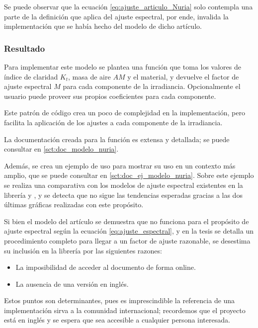 Se puede observar que la ecuación \ref{eq:ajuste_articulo_Nuria} solo contempla una parte de la definición que aplica del ajuste espectral, por ende, invalida la implementación que se había hecho del modelo de dicho artículo.

\subsubsection{Resultado}

Para implementar este modelo se plantea una función que toma los valores de índice de claridad $K_t$, masa de aire $AM$ y el material, y devuelve el factor de ajuste espectral $M$ para cada componente de la irradiancia. Opcionalmente el usuario puede proveer sus propios coeficientes para cada componente.

Este patrón de código crea un poco de complejidad en la implementación, pero facilita la aplicación de los ajustes a cada componente de la irradiancia.

La documentación creada para la función es extensa y detallada; se puede consultar en \ref{sct:doc_modelo_nuria}.

Además, se crea un ejemplo de uso para mostrar su uso en un contexto más amplio, que se puede consultar en \ref{sct:doc_ej_modelo_nuria}. Sobre este ejemplo se realiza una comparativa con los modelos de ajuste espectral existentes en la librería \cite{Lee_Panchula_2016} y \cite{osti919131}, y se detecta que no sigue las tendencias esperadas gracias a las dos últimas gráficas realizadas con este propósito.

Si bien el modelo del artículo \cite{Martín_Ruiz_1999} se demuestra que no funciona para el propósito de ajuste espectral según la ecuación \ref{eq:ajuste_espectral}, y en la tesis \cite{Martín_Chivelet_1999} se detalla un procedimiento completo para llegar a un factor de ajuste razonable, se desestima su inclusión en la librería por las siguientes razones:

\begin{itemize}
    \item La imposibilidad de acceder al documento de forma online.
    \item La ausencia de una versión en inglés.
\end{itemize}

Estos puntos son determinantes, pues es imprescindible la referencia de una implementación sirva a la comunidad internacional; recordemos que el proyecto \pvlibpy{} está en inglés y se espera que sea accesible a cualquier persona interesada.

